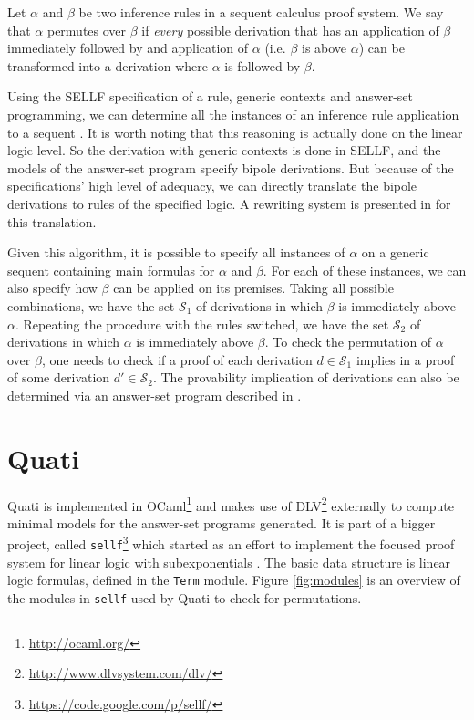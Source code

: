 \documentclass{llncs}
\begin{document}
\begin{definition}
Let $\alpha$ and $\beta$ be two inference rules in a sequent calculus proof
system. We say that $\alpha$ permutes over $\beta$ if \emph{every} possible
derivation that has an application of $\beta$ immediately followed by and
application of $\alpha$ (i.e. $\beta$ is above $\alpha$) can be transformed into
a derivation where $\alpha$ is followed by $\beta$.
\end{definition}

Using the SELLF specification of a rule, generic contexts and answer-set
programming, we can determine all the instances of an inference rule
application to a sequent \cite{iclp}. It is worth noting that this reasoning is
actually done on the linear logic level. So the derivation with generic contexts
is done in SELLF, and the models of the answer-set program specify bipole
derivations. But because of the specifications' high level of adequacy, we can
directly translate the bipole derivations to rules of the specified logic. A
rewriting system is presented in \cite{iclp} for this translation.

Given this algorithm, it is possible to specify all instances of $\alpha$ on a
generic sequent containing main formulas for $\alpha$ and $\beta$. For each of
these instances, we can also specify how $\beta$ can be applied on its premises.
Taking all possible combinations, we have the set $\mathcal{S}_1$ of
derivations in which $\beta$ is immediately above $\alpha$. Repeating the
procedure with the rules switched, we have the set $\mathcal{S}_2$ of
derivations in which $\alpha$ is immediately above $\beta$. To check the
permutation of $\alpha$ over $\beta$, one needs to check if a proof of each
derivation $d \in \mathcal{S}_1$ implies in a proof of some derivation $d' \in
\mathcal{S}_2$. The provability implication of derivations can also be
determined via an answer-set program described in \cite{iclp}.

\section{Quati}
\label{sec:quati}


Quati is implemented in OCaml\footnote{\url{http://ocaml.org/}} and makes use of
DLV\footnote{\url{http://www.dlvsystem.com/dlv/}} externally to compute minimal models for the
answer-set programs generated. It is part of a bigger project, called
\texttt{sellf}\footnote{\url{https://code.google.com/p/sellf/}} which started as an effort to
implement the focused proof system for linear logic with subexponentials
\cite{vivek's thesis}. The basic data structure is linear logic formulas,
defined in the \texttt{Term} module. Figure \ref{fig:modules} is an overview
of the modules in \texttt{sellf} used by Quati to check for permutations.
\end{document}
